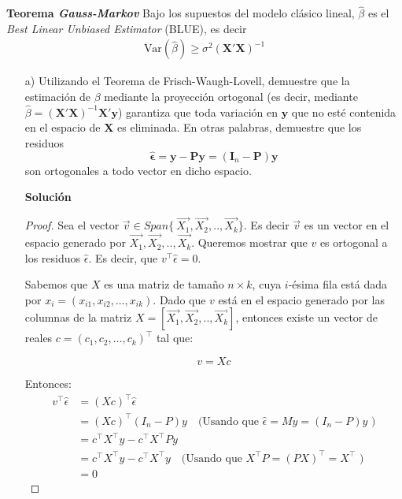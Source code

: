 \documentclass[a4paper, answers, addpoints, 11pt]{exam}
\newenvironment{solucion}{%
  \begin{mdframed}[
    backgroundcolor=blue!5,    %
    linecolor=blue!50,          %
    linewidth=2pt,              %
    leftmargin=10pt,            %
    rightmargin=10pt,           %
    topline=true,              %
    bottomline=true,            %
    roundcorner=10pt,           %
    innerleftmargin=10pt,       %
    innerrightmargin=10pt,      %
    innerbottommargin=10pt,     %
    innertopmargin=10pt         %
  ]%
  \begin{tcolorbox}[colframe=blue!50!black, colback=blue!50, coltitle=white, sharp corners=all, boxrule=1mm, width=\textwidth, halign=left, valign=center, top=0mm, bottom=0mm, left=0mm, right=0mm] \textbf{Solución} \end{tcolorbox} }{\end{mdframed}}
\begin{document}
\begin{enumerate}
\begin{mdframed}
\textbf{Teorema \textit{Gauss-Markov}}
Bajo los supuestos del modelo clásico lineal, \(\hat{\beta}\) es el \emph{Best Linear Unbiased Estimator} (BLUE), es decir
\begin{align}
   \text{Var}(\hat{\beta}) \geq \sigma^2 (\mathbf{X}' \mathbf{X})^{-1}    \tag{Gauss-Markov}
\end{align}
\end{mdframed}

\begin{itemize}
    \item[a)] Utilizando el Teorema de Frisch-Waugh-Lovell, demuestre que la estimación de \(\beta\) mediante la proyección ortogonal (es decir, mediante \(\hat{\beta} = (\mathbf{X}'\mathbf{X})^{-1}\mathbf{X}'\mathbf{y}\)) garantiza que toda variación en \(\mathbf{y}\) que no esté contenida en el espacio de \(\mathbf{X}\) es eliminada. En otras palabras, demuestre que los residuos
\[
\hat{\boldsymbol\epsilon} = \mathbf{y} - \mathbf{P}\mathbf{y} = (\mathbf{I}_n - \mathbf{P})\mathbf{y}
\]
son ortogonales a todo vector en dicho espacio.

 \begin{solucion}
  \begin{proof}
     Sea el vector \(\vec{v}  \in Span \{\ \vec{X_1}, \vec{X_2},.., \vec{X_k} \}\). Es decir $\vec{v}$ es un vector en el espacio generado por \( \vec{X_1}, \vec{X_2},.., \vec{X_k} \). Queremos mostrar que \( v \) es ortogonal a los residuos \( \hat{\epsilon} \). Es decir, que \( v^\top \hat{\epsilon} = 0 \).

Sabemos que \( X \) es una matriz de tamaño \( n \times k \), cuya \( i \)-ésima fila está dada por \( x_i = (x_{i1}, x_{i2}, \dots, x_{ik}) \).
Dado que \( v \) está en el espacio generado por las columnas de la matriz \( X = [\vec{X_1}, \vec{X_2},.., \vec{X_k}] \), entonces existe un vector de reales \( c = (c_1, c_2, \dots, c_k)^\top \) tal que:

\[
v = X c
\]

Entonces:
\begin{align*}
    v^\top \hat{\epsilon} & = (X c)^\top \hat{\epsilon}\\
    & = (Xc)^\top (I_n - P) y \quad \text{(Usando que $\hat{\epsilon}=My=(I_n - P)y$ )} \\
     & = c^\top X^\top y - c^\top X^\top P y \\
                       &= c^\top X^\top y - c^\top X^\top y \quad \text{(Usando que $X^\top P=(P X)^\top=X^\top$ )}\\
                       &= 0
\end{align*}


\end{proof}
\end{solucion}
\end{itemize}
\end{enumerate}
\end{document}
